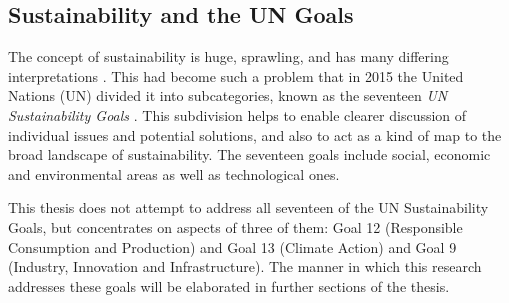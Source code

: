 
\subsection{Sustainability and the UN Goals}

The concept of sustainability is huge, sprawling, and has many differing interpretations . This had become such a problem that in 2015 the United Nations (UN) divided it into subcategories, known as the seventeen \emph{UN Sustainability Goals} \citep{UnitedNations2015}. This subdivision helps to enable clearer discussion of individual issues and potential solutions, and also to act as a kind of map to the broad landscape of sustainability. The seventeen goals include social, economic and environmental areas as well as technological ones.

This thesis does not attempt to address all seventeen of the UN Sustainability Goals, but concentrates on aspects of three of them: Goal 12 (Responsible Consumption and Production) and Goal 13 (Climate Action) and Goal 9 (Industry, Innovation and Infrastructure). The manner in which this research addresses these goals will be elaborated in further sections of the thesis.
